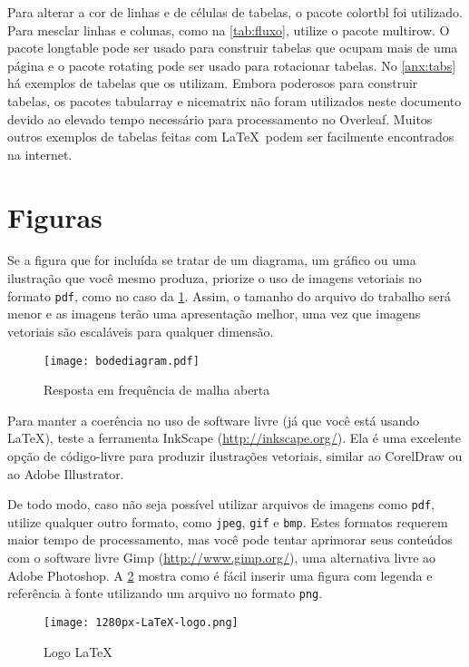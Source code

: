 Para alterar a cor de linhas e de células de tabelas, o pacote \textsf{colortbl} foi utilizado. Para mesclar linhas e colunas, como na \cref{tab:fluxo}, utilize o pacote \textsf{multirow}. O pacote \textsf{longtable} pode ser usado para construir tabelas que ocupam mais de uma página e o pacote \textsf{rotating} pode ser usado para rotacionar tabelas. No \cref{anx:tabs} há exemplos de tabelas que os utilizam. Embora poderosos para construir tabelas, os pacotes \textsf{tabularray} e \textsf{nicematrix} não foram utilizados neste documento devido ao elevado tempo necessário para processamento no Overleaf. Muitos outros exemplos de tabelas feitas com \LaTeX\ podem ser facilmente encontrados na internet.

\section{Figuras}

Se a figura que for incluída se tratar de um diagrama, um gráfico ou uma ilustração que você mesmo produza, priorize o uso de imagens vetoriais no formato \texttt{pdf}, como no caso da \cref{fig:grafico}. Assim, o tamanho do arquivo do trabalho será menor e as imagens terão uma apresentação melhor, uma vez que imagens vetoriais são escaláveis para qualquer dimensão.

\begin{figure}[htb]
    \centering
    \caption{Resposta em frequência de malha aberta}
    \label{fig:grafico}
    \texttt{[image: bodediagram.pdf]}
\end{figure}

Para manter a coerência no uso de software livre (já que você está usando \LaTeX), teste a ferramenta \textsf{InkScape} (\url{http://inkscape.org/}). Ela é uma excelente opção de código-livre para produzir ilustrações vetoriais, similar ao CorelDraw ou ao Adobe Illustrator.

De todo modo, caso não seja possível utilizar arquivos de imagens como \texttt{pdf}, utilize qualquer outro formato, como \texttt{jpeg}, \texttt{gif} e \texttt{bmp}. Estes formatos requerem maior tempo de processamento, mas você pode tentar aprimorar seus conteúdos com o software livre \textsf{Gimp} (\url{http://www.gimp.org/}), uma alternativa livre ao Adobe Photoshop. A \cref{fig:logolatex} mostra como é fácil inserir uma figura com legenda e referência à fonte utilizando um arquivo no formato \texttt{png}.

\begin{figure}[htb]
    \begin{center}
    \caption{Logo \LaTeX} \label{fig:logolatex}
    \texttt{[image: 1280px-LaTeX-logo.png]}
    \captionsetup{aboveskip=0pt,belowskip=2pt}
    \end{center}
\end{figure}

